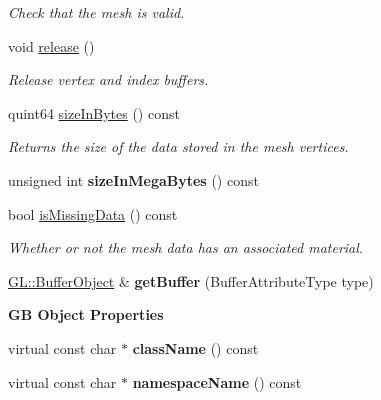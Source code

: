 \begin{Indent}
\begin{DoxyCompactItemize}
\begin{DoxyCompactList}\small\item\em Check that the mesh is valid. \end{DoxyCompactList}\item 
\mbox{\label{classrev_1_1_vertex_array_data_a316535b40fb3b9bc066a7a43a9dc0e2a}} 
void \mbox{\hyperlink{classrev_1_1_vertex_array_data_a316535b40fb3b9bc066a7a43a9dc0e2a}{release}} ()
\begin{DoxyCompactList}\small\item\em Release vertex and index buffers. \end{DoxyCompactList}\item 
\mbox{\label{classrev_1_1_vertex_array_data_a4a1911f0b5e3065ffdd8deff6e315eea}} 
quint64 \mbox{\hyperlink{classrev_1_1_vertex_array_data_a4a1911f0b5e3065ffdd8deff6e315eea}{size\+In\+Bytes}} () const
\begin{DoxyCompactList}\small\item\em Returns the size of the data stored in the mesh vertices. \end{DoxyCompactList}\item 
\mbox{\label{classrev_1_1_vertex_array_data_a506020514e8ed2d47ee4768c7320070d}} 
unsigned int {\bfseries size\+In\+Mega\+Bytes} () const
\item 
bool \mbox{\hyperlink{classrev_1_1_vertex_array_data_a35c6ded4eae6cb8288f9862e14e3d928}{is\+Missing\+Data}} () const
\begin{DoxyCompactList}\small\item\em Whether or not the mesh data has an associated material. \end{DoxyCompactList}\item 
\mbox{\label{classrev_1_1_vertex_array_data_a44d8ec5a7a6d63fef55fccf368fa7e00}} 
\mbox{\hyperlink{classrev_1_1_g_l_1_1_buffer_object}{G\+L\+::\+Buffer\+Object}} \& {\bfseries get\+Buffer} (Buffer\+Attribute\+Type type)
\end{DoxyCompactItemize}
\end{Indent}
\begin{Indent}\textbf{ GB Object Properties}\par
\begin{DoxyCompactItemize}
\item 
\mbox{\label{classrev_1_1_vertex_array_data_a2608b4fcc9c8b702b178e67356ab5504}} 
virtual const char $\ast$ {\bfseries class\+Name} () const
\item 
\mbox{\label{classrev_1_1_vertex_array_data_a13db21b77c0e8bf8c79163d318fd8e6a}} 
virtual const char $\ast$ {\bfseries namespace\+Name} () const
\end{DoxyCompactItemize}
\end{Indent}
